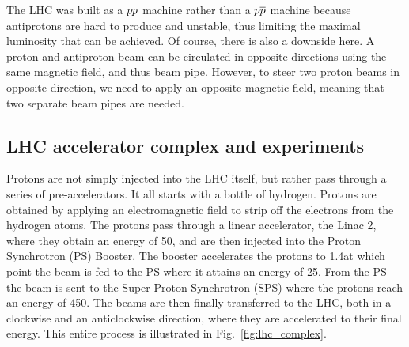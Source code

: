 The LHC was built as a ${p}{p}$ machine rather than a ${p}{\overline{p}}$ machine because antiprotons are
hard to produce and unstable, thus limiting the maximal luminosity that can be achieved. Of course,
there is also a downside here. A proton and antiproton beam can be circulated in opposite
directions using the same magnetic field, and thus beam pipe. However, to steer two proton beams in
opposite direction, we need to apply an opposite magnetic field, meaning that two separate beam
pipes are needed. 

\subsection{LHC accelerator complex and experiments}


Protons are not simply injected into the LHC itself, but rather pass through a series of
pre-accelerators. 
It all starts with a bottle of hydrogen. Protons are obtained by applying an electromagnetic field
to strip off the electrons from the hydrogen atoms. The protons pass through a linear accelerator,
the Linac 2, where they obtain an energy of 50\MeV, and are then injected into the Proton
Synchrotron (PS) Booster. The booster accelerates the protons to 1.4\GeV at which point the beam is
fed to the PS where it attains an energy of 25\GeV. From the PS the beam is sent to the Super Proton
Synchrotron (SPS) where the protons reach an energy of 450\GeV. 
The beams are then finally transferred to the LHC, both in a clockwise and an anticlockwise
direction, where they are accelerated to their final energy. This entire process is illustrated in
Fig.~\ref{fig:lhc_complex}. 

